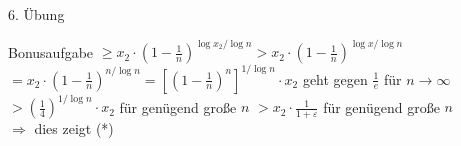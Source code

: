 \begin{section}{6. Übung}
\begin{subsection}{Bonusaufgabe}
  $\geq x_2 \cdot (1-\frac{1}{n})^{\log x_2 / \log n} > x_2 \cdot (1- \frac{1}{n})^{\log x / \log n}$\\
  $ = x_2 \cdot (1-\frac{1}{n})^{n/ \log n} = [(1-\frac{1}{n})^n]^{1/ \log n} \cdot x_2$ geht gegen $\frac{1}{e}$ für $n \rightarrow \infty$ \\
  $> (\frac{1}{4})^{1 / \log n} \cdot x_2$ für genügend große $n$ $> x_2 \cdot \frac{1}{1+\varepsilon}$ für genügend große $n$ \\
  $\Rightarrow$ dies zeigt (*)
 \end{subsection}



\end{section}
